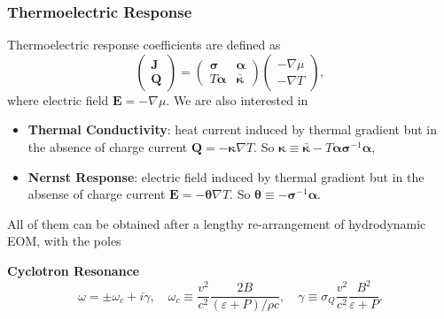 \documentclass[10pt,aspectratio=43,xcolor=x11names,t]{beamer}%
\begin{document}
		\begin{frame}\frametitle{Thermoelectric Response}
			Thermoelectric response coefficients are defined as		
			\begin{equation*}
				\left(\begin{array}{c}
					\bm{J}\\\bm{Q}
				\end{array}\right)=\left(\begin{array}{cc}
					\bm{\sigma}&\bm{\alpha}\\T\bm{\alpha}&\bm{\bar{\kappa}}
				\end{array}\right) \left(\begin{array}{c}
					-\nabla\mu\\-\nabla T
				\end{array}\right), 
			\end{equation*}
			where electric field $\bm{E}=-\nabla\mu$. We are also interested in 
			\begin{itemize}
				\item \textbf{Thermal Conductivity}: heat current induced by thermal gradient but in the absence of charge current $\bm{Q}=-\bm{\kappa}\nabla T$. So $\bm{\kappa}\equiv\bm{\bar{\kappa}}-T\bm{\alpha}\bm{\sigma}^{-1}\bm{\alpha}$,
				\item \textbf{Nernst Response}: electric field induced by thermal gradient but in the absense of charge current $\bm{E}=-\bm{\theta}\nabla T$. So $\bm{\theta}\equiv-\bm{\sigma}^{-1}\bm{\alpha}$.
			\end{itemize}
			\pause
			All of them can be obtained after a lengthy re-arrangement of hydrodynamic EOM, with the poles
			\begin{block}{\textbf{Cyclotron Resonance}}
				\begin{equation*}
					\omega=\pm\omega_c+i\gamma,\quad \omega_c\equiv\dfrac{v^2}{c^2}\dfrac{2B}{(\varepsilon+P)/\rho c},\quad \gamma\equiv\sigma_Q\dfrac{v^2}{c^2}\dfrac{B^2}{\varepsilon+P}.
				\end{equation*}
			\end{block}
		\end{frame}
\end{document}
